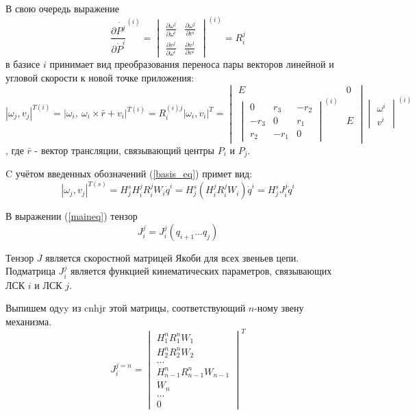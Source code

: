 В свою очередь выражение
\begin{equation}\label{}
\frac{\partial{\dot{P^j}}}{\partial{\dot{P}^i}}^{(i)}
=
\begin{vmatrix}
\frac{\partial{\omega^j}}{\partial{\omega^i}} & \frac{\partial{\omega^j}}{\partial{v^i}} \\
\frac{\partial{v^j}}{\partial{\omega^i}} & \frac{\partial{v^j}}{\partial{v^i}}
\end{vmatrix}^{(i)}=R_i^j
\end{equation}
в базисе $i$ принимает вид преобразования переноса пары векторов линейной и угловой скорости к новой точке приложения:
\begin{equation}\label{}
|\omega_j, v_j|^{T(i)} = |\omega_i,\ \omega_i \times \bar{r} + v_i|^{T(i)} = R^{(i)j}_{i}|\omega_i, v_i|^T=
\begin{vmatrix}
E & 0\\
\begin{vmatrix}
0 & r_3 & -r_2\\
-r_3 & 0 & r_1\\
r_2 & -r_1 & 0
\end{vmatrix}
^{(i)} & E
\end{vmatrix}
\begin{vmatrix}
\omega^i\\
v^i
\end{vmatrix}^{(i)}
\end{equation}, где $\bar{r}$ - вектор трансляции, связывающий центры $P_i$ и $P_j$.

C учётом введенных обозначений (\ref{basis_eq}) примет вид:
\begin{equation}\label{maineq}
|\omega_j, v_j|^{T(s)} = H^s_j H^j_i R^j_i W_i \dot{q}^i = H^s_j (H^j_i R^j_i W_i) \dot{q}^i = H^s_j J^{j}_i \dot{q}^i
\end{equation}

В выражении (\ref{maineq}) тензор 
\begin{equation}\label{}
J_i^j = J_i^j(q_{i+1}...q_j)
\end{equation} 

Тензор $J$ является скоростной матрицей Якоби для всех звеньев цепи. Подматрица $J^j_i$ является функцией кинематических параметров, связывающих ЛСК $i$ и ЛСК $j$.

Выпишем одyy из cnhjr этой матрицы, соответствующий $n$-ному звену механизма.
\begin{equation}\label{}
J_i^{j=n} =  
\begin{vmatrix}
H^n_1R^n_1W_1 \\
H^n_2R^n_2W_2 \\
... \\
H^n_{n-1}R^n_{n-1}W_{n-1} \\
W_{n} \\
... \\
0
\end{vmatrix}^T
\end{equation}

